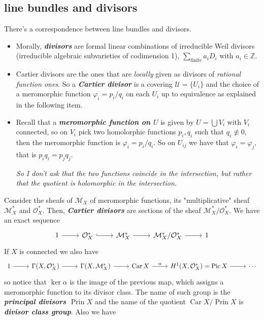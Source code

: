 \documentclass{article}
\newcommand{\Z}{\mathbb{Z}}
\newcommand{\Mc}{\mathcal{M}}
\newcommand{\Oc}{\mathcal{O}}
\newcommand{\Uc}{\mathcal{U}}
\DeclareMathOperator{\Pic}{Pic}
\DeclareMathOperator{\Car}{Car}
\DeclareMathOperator{\Prin}{Prin}
\begin{document}
\subsection{line bundles and divisors}
There's a correspondence between line bundles and divisors.
\begin{defn}\leavevmode
	\begin{itemize}
		\item Morally, \textbf{\textit{divisors}} are formal linear combinations of irreducible Weil divisors (irreducible algebraic subvarieties of codimension 1), $\sum_{\text{finite}}a_iD_i$ with $a_i\in\Z$.
		\item Cartier divisors are the ones that are \textit{locally} given as divisors of \textit{rational function ones}. So a \textbf{\textit{Cartier divisor}} is a covering $\Uc=\{U_i\}$ and the choice of a meromorphic function $\varphi_i=p_i/q_i$ on each $U_i$ up to equivalence as explained in the following item.
		\item Recall that a \textbf{\textit{meromorphic function on $U$}} is given by $U=\bigcup V_i$ with $V_i$ connected, so on $V_i$ pick two homolorphic functions $p_i,q_i$ such that $q_i\not\equiv0$, then the meromorphic function is $\varphi_i=p_i/q_i$. So on $U_{ij}$ we have that $\varphi_i=\varphi_j$, that is $p_iq_i=p_jq_j$.
	
		\textit{So I don't ask that the two functions coincide in the intersection, but rather that the quotient is holomorphic in the intersection.}
		
	\end{itemize}
\end{defn}
Consider the sheafs of $\Mc_X$ of meromorphic functions, its "multiplicative" sheaf $\Mc^*_X$ and $\Oc^*_X$. Then, \textbf{\textit{Cartier divisors}} are sections of the sheaf $\Mc_X^*/\Oc_X^*$. We have an exact sequence
\[\begin{tikzcd}
	1\arrow[r]&\Oc_X^*\arrow[r,hook]&\Mc_X^*\arrow[r]&\Mc_X^*/\Oc_X^*\arrow[r]&1
\end{tikzcd}\]
If $X$ is connected we also have
\[\begin{tikzcd}
	1\arrow[r]&\Gamma(X,\Oc_X^*)\arrow[r]&\Gamma(X,\Mc_X^*)\arrow[r]&\Car X\arrow[r,"\alpha"]&H^1(X,\Oc_X^*)=\Pic X\arrow[r]&\cdots
\end{tikzcd}\]
so notice that $\ker\alpha$ is the image of the previous map, which assigns a meromorphic function to its divisor class. The name of such group is the \textbf{\textit{principal divisors $\Prin X$}} and the name of the quotient $\Car X/\Prin X$ is \textbf{\textit{divisor class group}}. Also we have
\end{document}
